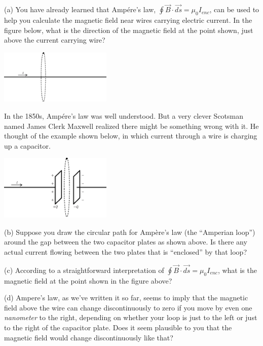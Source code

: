 (a) You have already learned that Amp\'ere's law, $\oint \vec B \cdot \vec{ds} = \mu_0I_{enc}$, can be used to help you calculate the magnetic field near wires carrying electric current.  In the figure below, what is the direction of the magnetic field at the point shown, just above the current carrying wire?

\begin{center}
    \includegraphics[width=0.4\textwidth]{deriving_em_waves/wire_and_loop.eps}
\end{center}

In the 1850s, Amp\'ere's law was well understood.  But a very clever Scotsman named James Clerk Maxwell realized there might be something wrong with it.  He thought of the example shown below, in which current through a wire is charging up a capacitor.
\begin{center}
    \includegraphics[width=0.4\textwidth]{deriving_em_waves/capacitor_and_loop.eps}
\end{center}

(b) Suppose you draw the circular path for Amp\`ere's law (the ``Amperian loop'') around the gap between the two capacitor plates as shown above.  Is there any actual current flowing between the two plates that is ``enclosed'' by that loop?   
\vspace{0.5in}

(c) According to a straightforward interpretation of $\oint \vec B \cdot \vec{ds} = \mu_0I_{enc}$, what is the magnetic field at the point shown in the figure above?  
\vspace{0.5in}

(d) Ampere's law, as we've written it so far, seems to imply that the magnetic field above the wire can change discontinuously to zero if you move by even one \textit{nanometer} to the right, depending on whether your loop is just to the left or just to the right of the capacitor plate.  Does it seem plausible to you that the magnetic field would change discontinuously like that?
\vspace{0.5in}

